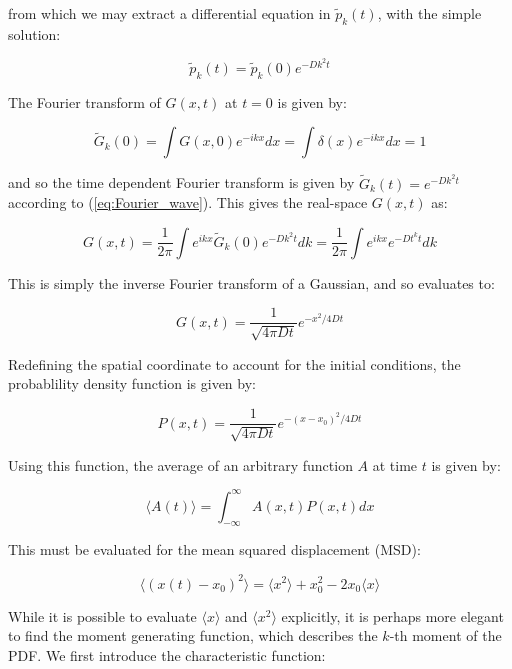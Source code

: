\documentclass[11pt, a4paper]{article} %
\begin{document}
\begin{appendices}
from which we may extract a differential equation in $\tilde{p}_{k}(t)$, with the simple solution:

\begin{equation} \label{eq:Fourier_wave}
\tilde{p}_{k}(t) = \tilde{p}_{k}(0)e^{-Dk^{2}t}
\end{equation}

The Fourier transform of $G(x,t)$ at $t=0$ is given by:

\begin{equation}
\tilde{G}_{k}(0) = \int G(x,0)e^{-ikx}dx = \int \delta(x)e^{-ikx}dx = 1
\end{equation}

and so the time dependent Fourier transform is given by $\tilde{G}_{k}(t) = e^{-Dk^{2}t}$ according to (\ref{eq:Fourier_wave}). This gives the real-space $G(x,t)$ as:

\begin{equation}
G(x,t) = \frac{1}{2\pi} \int e^{ikx} \tilde{G}_{k}(0)e^{-Dk^{2}t}dk = \frac{1}{2\pi} \int e^{ikx} e^{-Dt^{k}t}dk
\end{equation}

This is simply the inverse Fourier transform of a Gaussian, and so evaluates to:

\begin{equation}
G(x,t) = \frac{1}{\sqrt{4\pi Dt}}e^{-x^{2}/4Dt}
\end{equation}

Redefining the spatial coordinate to account for the initial conditions, the probablility density function is given by:

\begin{equation}
P(x,t) = \frac{1}{\sqrt{4\pi Dt}}e^{-(x-x_{0})^{2}/4Dt}
\end{equation}

Using this function, the average of an arbitrary function $A$ at time $t$ is given by:

\begin{equation}
\langle A(t) \rangle = \int_{-\infty}^{\infty} A(x,t)P(x,t) dx
\end{equation}

This must be evaluated for the mean squared displacement (MSD):

\begin{equation} \label{eq:MSD_theory} 
\langle (x(t) - x_{0})^{2} \rangle = \langle x^2 \rangle + x_{0}^{2} -2x_{0}\langle x \rangle 
\end{equation}

 
While it is possible to evaluate $\langle x \rangle$ and $\langle x^2 \rangle$ explicitly, it is perhaps more elegant to find the moment generating function, which describes the $k$-th moment of the PDF. We first introduce the characteristic function:


\end{appendices}
\end{document}
